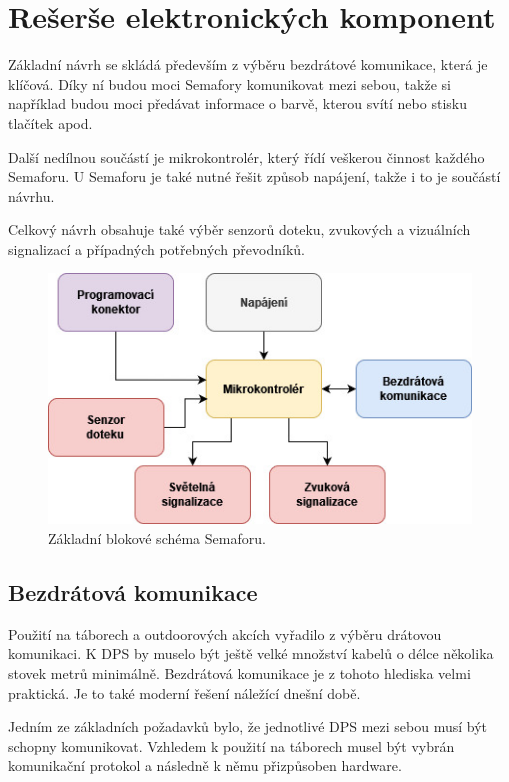 \chapter{Rešerše elektronických komponent}
Základní návrh se skládá především z výběru bezdrátové komunikace, která je klíčová. Díky ní budou moci Semafory komunikovat mezi 
sebou, takže si například budou moci předávat informace o barvě, kterou svítí nebo stisku tlačítek apod. 

Další nedílnou součástí je mikrokontrolér, který řídí veškerou činnost každého Semaforu. U Semaforu je také nutné řešit způsob napájení,
takže i to je součástí návrhu.

Celkový návrh obsahuje také výběr senzorů doteku, zvukových a vizuálních signalizací a případných potřebných převodníků. 

\begin{figure}[!h]
  \begin{center}
    \includegraphics[scale=0.7]{obrazky/zakladni_blokove_schema.jpg}
  \end{center}
  \caption[Základní blokové schéma Semaforu]{Základní blokové schéma Semaforu.}
\end{figure}

\section{Bezdrátová komunikace}
Použití na táborech a outdoorových akcích vyřadilo z výběru drátovou komunikaci. K DPS by muselo být ještě velké množství kabelů 
o délce několika stovek metrů minimálně. Bezdrátová komunikace je z tohoto hlediska velmi praktická. Je to také moderní řešení 
náležící dnešní době. 

Jedním ze základních požadavků bylo, že jednotlivé DPS mezi sebou musí být schopny komunikovat. Vzhledem k použití na táborech 
musel být vybrán komunikační protokol a následně k němu přizpůsoben hardware. 

